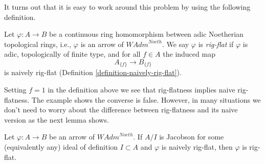 \noindent
It turns out that it is easy to work around this problem by
using the following definition.

\begin{definition}
\label{definition-rig-flat-continuous-homomorphism}
Let $\varphi : A \to B$ be a continuous ring homomorphism between
adic Noetherian topological rings, i.e., $\varphi$ is an arrow of
$\textit{WAdm}^{Noeth}$. We say $\varphi$ is {\it rig-flat} if $\varphi$
is adic, topologically of finite type, and for all $f \in A$ the induced map
$$
A_{\{f\}} \longrightarrow B_{\{f\}}
$$
is naively rig-flat (Definition \ref{definition-naively-rig-flat}).
\end{definition}

\noindent
Setting $f = 1$ in the definition above we see that rig-flatness
implies naive rig-flatness. The example shows the converse is false.
However, in many situations we don't need to worry about the difference
between rig-flatness and its naive version as the next lemma shows.

\begin{lemma}
\label{lemma-rig-flat-naive}
Let $\varphi : A \to B$ be an arrow of $\textit{WAdm}^{Noeth}$.
If $A/I$ is Jacobson for some (equivalently any) ideal of definition
$I \subset A$ and $\varphi$ is naively rig-flat, then $\varphi$ is
rig-flat.
\end{lemma}

